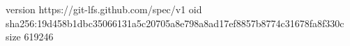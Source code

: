 version https://git-lfs.github.com/spec/v1
oid sha256:19d458b1dbc35066131a5c20705a8e798a8ad17ef8857b8774c31678fa8f330c
size 619246
